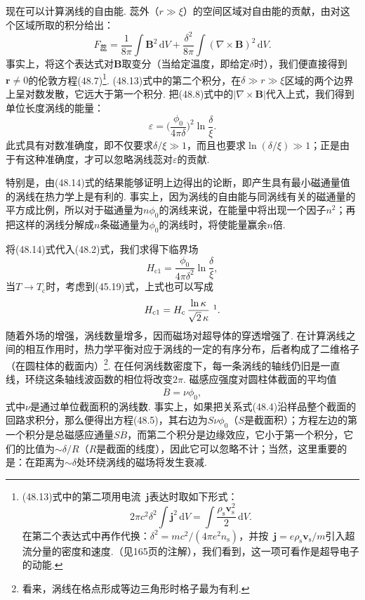 现在可以计算涡线的自由能. 蕊外（$r\gg\xi$）的空间区域对自由能的贡献，由对这个区域所取的积分给出：
\begin{equation}
F_{\text{蕊}}=\frac{1}{8\pi}\int\bm{B}^2\,\mathrm{d}V
+\frac{\delta^2}{8\pi}\int(\nabla\times\bm{B})^2\,\mathrm{d}V.
\end{equation}
事实上，将这个表达式对$\bm{B}$取变分（当给定温度，即给定$\delta$时），我们便直接得到$\bm{r}\neq0$的伦敦方程(48.7)\footnote{(48.13)式中的第二项用电流~$\bm j$表达时取如下形式：
\begin{equation*}
2\pi c^2\delta^2\int\bm j^2\,\mathrm dV=\int\frac{\rho_{\mathrm s}\bm v_{\mathrm s}^2}{2}\,\mathrm dV.
\end{equation*}
在第二个表达式中再作代换：$\delta^2=mc^2/(4\pi e^2n_{\mathrm s})$，并按~$\bm j=e\rho_{\mathrm s}\bm v_{\mathrm s}/m$引入超流分量的密度和速度.（见165页的注解），我们看到，这一项可看作是超导电子的动能.}. (48.13)式中的第二个积分，在$\delta\gg r\gg\xi$区域的两个边界上呈对数发散，它远大于第一个积分. 把(48.8)式中的$|\nabla\times\bm{B}|$代入上式，我们得到单位长度涡线的能量：
\begin{equation}
\varepsilon=\biggl(\frac{\phi_0}{4\pi\delta}\biggr)^{\!2}\ln\frac{\delta}{\xi}.
\end{equation}
此式具有对数准确度，即不仅要求$\delta/\xi\gg1$，而且也要求$\ln(\delta/\xi)\gg1$；正是由于有这种准确度，才可以忽略涡线蕊对$\varepsilon$的贡献.

特别是，由(48.14)式的结果能够证明上边得出的论断，即产生具有最小磁通量值的涡线在热力学上是有利的. 事实上，因为涡线的自由能与同涡线有关的磁通量的平方成比例，所以对于磁通量为$n\phi_0$的涡线来说，在能量中将出现一个因子$n^2$；再把这样的涡线分解成$n$条磁通量为$\phi_0$的涡线时，将使能量赢余$n$倍.

将(48.14)式代入(48.2)式，我们求得下临界场
\begin{equation}
H_{\mathrm{c}1}=\frac{\phi_0}{4\pi\delta^2}\ln\frac{\delta}{\xi},
\end{equation}
当$T\to T_{\mathrm{c}}$时，考虑到(45.19)式，上式也可以写成
\begin{equation}
H_{\mathrm{c}1}=H_{\mathrm{c}}\,\frac{\ln\kappa}{\sqrt{2}\,\kappa}\ \footnotemark.
\end{equation}
随着外场的增强，涡线数量增多，因而磁场对超导体的穿透增强了. 在计算涡线之间的相互作用时，热力学平衡对应于涡线的一定的有序分布，后者构成了二维格子（在圆柱体的截面内）\footnote{看来，涡线在格点形成等边三角形时格子最为有利.}. 在任何涡线数密度下，每一条涡线的轴线仍旧是一直线，环绕这条轴线波函数的相位将改变$2\pi$. 磁感应强度对圆柱体截面的平均值
\begin{equation}
\overline{B}=\nu\phi_0,
\end{equation}
式中$\nu$是通过单位截面积的涡线数. 事实上，如果把关系式(48.4)沿样品整个截面的回路求积分，那么便得出方程(48.5)，其右边为$S\nu\phi_0$（$S$是截面积）；方程左边的第一个积分是总磁感应通量$S\overline{B}$，而第二个积分是边缘效应，它小于第一个积分，它们的比值为$\sim\delta/R$（$R$是截面的线度），因此它可以忽略不计；当然，这里重要的是：在距离为$\sim\delta$处环绕涡线的磁场将发生衰减.

